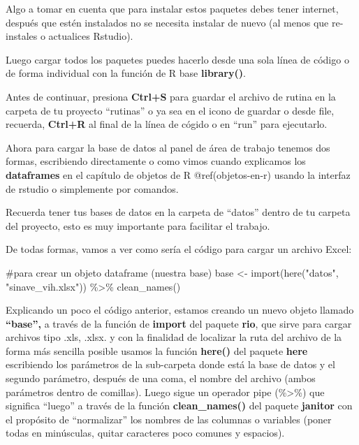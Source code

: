 \documentclass[
  letterpaper,
  DIV=11,
  numbers=noendperiod]{scrreprt}
\newenvironment{Shaded}{\begin{snugshade}}{\end{snugshade}}
\newcommand{\CommentTok}[1]{\textcolor[rgb]{0.37,0.37,0.37}{#1}}
\newcommand{\FunctionTok}[1]{\textcolor[rgb]{0.28,0.35,0.67}{#1}}
\newcommand{\NormalTok}[1]{\textcolor[rgb]{0.00,0.23,0.31}{#1}}
\newcommand{\OtherTok}[1]{\textcolor[rgb]{0.00,0.23,0.31}{#1}}
\newcommand{\SpecialCharTok}[1]{\textcolor[rgb]{0.37,0.37,0.37}{#1}}
\newcommand{\StringTok}[1]{\textcolor[rgb]{0.13,0.47,0.30}{#1}}
\begin{document}
Algo a tomar en cuenta que para instalar estos paquetes debes tener
internet, después que estén instalados no se necesita instalar de nuevo
(al menos que re-instales o actualices Rstudio).

Luego cargar todos los paquetes puedes hacerlo desde una sola línea de
código o de forma individual con la función de R base
\textbf{library()}.

Antes de continuar, presiona \textbf{Ctrl+S} para guardar el archivo de
rutina en la carpeta de tu proyecto ``rutinas'' o ya sea en el icono de
guardar o desde file, recuerda, \textbf{Ctrl+R} al final de la línea de
cógido o en ``run'' para ejecutarlo.

Ahora para cargar la base de datos al panel de área de trabajo tenemos
dos formas, escribiendo directamente o como vimos cuando explicamos los
\textbf{dataframes} en el capítulo de objetos de R @ref(objetos-en-r)
usando la interfaz de rstudio o simplemente por comandos.

Recuerda tener tus bases de datos en la carpeta de ``datos'' dentro de
tu carpeta del proyecto, esto es muy importante para facilitar el
trabajo.

De todas formas, vamos a ver como sería el código para cargar un archivo
Excel:

\begin{Shaded}
\begin{Highlighting}[]
\CommentTok{\#para crear un objeto dataframe (nuestra base)}
\NormalTok{base }\OtherTok{\textless{}{-}} \FunctionTok{import}\NormalTok{(}\FunctionTok{here}\NormalTok{(}\StringTok{"datos"}\NormalTok{, }\StringTok{"sinave\_vih.xlsx"}\NormalTok{)) }\SpecialCharTok{\%\textgreater{}\%} 
         \FunctionTok{clean\_names}\NormalTok{()}
\end{Highlighting}
\end{Shaded}

Explicando un poco el código anterior, estamos creando un nuevo objeto
llamado \textbf{``base'',} a través de la función de \textbf{import} del
paquete \textbf{rio}, que sirve para cargar archivos tipo .xls, .xlsx. y
con la finalidad de localizar la ruta del archivo de la forma más
sencilla posible usamos la función \textbf{here()} del paquete
\textbf{here} escribiendo los parámetros de la sub-carpeta donde está la
base de datos y el segundo parámetro, después de una coma, el nombre del
archivo (ambos parámetros dentro de comillas). Luego sigue un operador
pipe (\%\textgreater\%) que significa ``luego'' a través de la función
\textbf{clean\_names()} del paquete \textbf{janitor} con el propósito de
``normalizar'' los nombres de las columnas o variables (poner todas en
minúsculas, quitar caracteres poco comunes y espacios).
\end{document}

